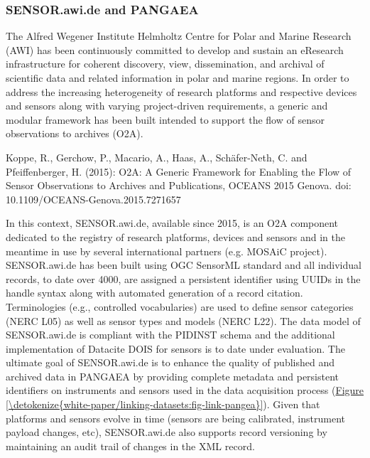 \documentclass[a4paper,10pt,english]{sphinxmanual}
\begin{document}
\subsubsection{SENSOR.awi.de and PANGAEA}
\label{\detokenize{white-paper/adoption:sensor-awi-de-and-pangaea}}
The Alfred Wegener Institute Helmholtz Centre for Polar and Marine
Research (AWI) has been continuously committed to develop and sustain an
eResearch infrastructure for coherent discovery, view, dissemination,
and archival of scientific data and related information in polar and
marine regions. In order to address the increasing heterogeneity of
research platforms and respective devices and sensors along with varying
project-driven requirements, a generic and modular framework has been
built intended to support the flow of sensor observations to archives
(O2A).%
\begin{footnote}[5]\sphinxAtStartFootnote
Koppe, R., Gerchow, P., Macario, A., Haas, A., Schäfer-Neth, C.
and Pfeiffenberger, H. (2015): O2A: A Generic Framework for Enabling
the Flow of Sensor Observations to Archives and Publications, OCEANS
2015 Genova. doi: 10.1109/OCEANS-Genova.2015.7271657
%
\end{footnote} In this context, SENSOR.awi.de, available since
2015, is an O2A component dedicated to the registry of research
platforms, devices and sensors and in the meantime in use by several
international partners (e.g. MOSAiC project). SENSOR.awi.de has been
built using OGC SensorML standard and all individual records, to date
over 4000, are assigned a persistent identifier using UUIDs in the
handle syntax along with automated generation of a record
citation. Terminologies (e.g., controlled vocabularies) are used to
define sensor categories (NERC L05) as well as sensor types and models
(NERC L22). The data model of SENSOR.awi.de is compliant with the
PIDINST schema and the additional implementation of Datacite DOIS for
sensors is to date under evaluation.  The ultimate goal of SENSOR.awi.de
is to enhance the quality of published and archived data in PANGAEA by
providing complete metadata and persistent identifiers on instruments
and sensors used in the data acquisition process
(\hyperref[\detokenize{white-paper/linking-datasets:fig-link-pangea}]{Figure \ref{\detokenize{white-paper/linking-datasets:fig-link-pangea}}}). Given that platforms and sensors evolve
in time (sensors are being calibrated, instrument payload changes,
etc), SENSOR.awi.de also supports record versioning by maintaining an
audit trail of changes in the XML record.
\end{document}
